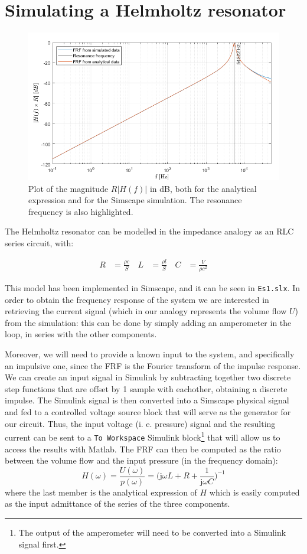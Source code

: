 \documentclass[a4paper]{article}
\begin{document}
\section{Simulating a Helmholtz resonator}

\begin{figure}[h!]
	\centering
	\includegraphics[width=0.7\linewidth]{es1.png}
	\caption{Plot of the magnitude $R|H(f)|$ in dB, both for the analytical expression and for the Simscape simulation. The resonance frequency is also highlighted.}
	\label{fig:es1}
\end{figure}

The Helmholtz resonator can be modelled in the impedance analogy as an RLC series circuit, with:

\begin{align*}
	R &= \frac{\rho c}{S}\, &
	L &= \frac{\rho l}{S}\, &
	C &= \frac{V}{\rho c^2}
\end{align*}

This model has been implemented in Simscape, and it can be seen in \texttt{Es1.slx}. In order to obtain the frequency response of the system we are interested in retrieving the current signal (which in our analogy represents the volume flow $U$) from the simulation: this can be done by simply adding an amperometer in the loop, in series with the other components.

Moreover, we will need to provide a known input to the system, and specifically an impulsive one, since the FRF is the Fourier transform of the impulse response. We can create an input signal in Simulink by subtracting together two discrete step functions that are offset by 1 sample with eachother, obtaining a discrete impulse. The Simulink signal is then converted into a Simscape physical signal and fed to a controlled voltage source block that will serve as the generator for our circuit. Thus, the input voltage (i. e. pressure) signal and the resulting current can be sent to a \texttt{To Workspace} Simulink block\footnote{The output of the amperometer will need to be converted into a Simulink signal first.} that will allow us to access the results with Matlab. The FRF can then be computed as the ratio between the volume flow and the input pressure (in the frequency domain):
$$ H(\omega) = \frac{U(\omega)}{p(\omega)} = \biggl( \mathrm{j}\omega L + R + \frac{1}{\mathrm{j}\omega C} \biggr)^{-1}$$
where the last member is the analytical expression of $H$ which is easily computed as the input admittance of the series of the three components.
\end{document}
